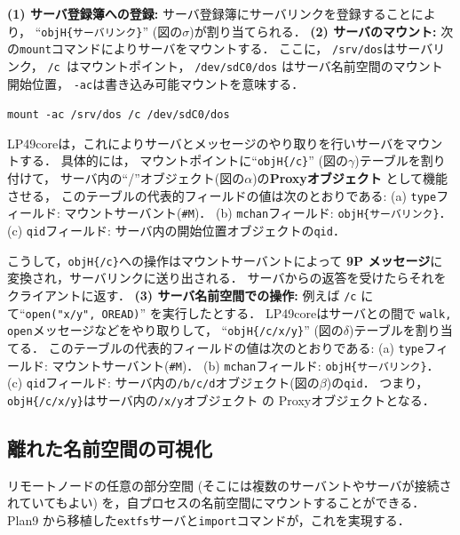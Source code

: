 \documentclass{ieicej}
\begin{document}
{\bf\flushleft (1) サーバ登録簿への登録: }
  サーバ登録簿にサーバリンクを登録することにより，
  ``{\tt objH\{サーバリンク\}}'' (図の$\sigma$)が割り当てられる．
%
{\bf\flushleft  (2) サーバのマウント: }
   次の{\tt mount}コマンドによりサーバをマウントする．
   ここに， {\tt /srv/dos}はサーバリンク，
   {\tt /c }はマウントポイント，
   {\tt /dev/sdC0/dos} はサーバ名前空間のマウント開始位置，
   {\tt -ac}は書き込み可能マウントを意味する．

   \verb|mount -ac /srv/dos /c /dev/sdC0/dos|

  LP49coreは，これによりサーバとメッセージのやり取りを行いサーバをマウントする．
  具体的には，
  マウントポイントに``{\tt objH\{/c\}}'' (図の$\gamma$)テーブルを割り付けて，
  サーバ内の``/''オブジェクト(図の$\alpha$)の{\bf Proxyオブジェクト}
  として機能させる，
%
    このテーブルの代表的フィールドの値は次のとおりである: 
    (a) {\tt type}フィールド: マウントサーバント(\verb|#M|)．
    (b) {\tt mchan}フィールド: {\tt objH\{サーバリンク\}}．
    (c) {\tt qid}フィールド: サーバ内の開始位置オブジェクトの{\tt qid}．

    こうして，{\tt objH\{/c\}}への操作はマウントサーバントによって
    {\bf 9P メッセージ}に変換され，サーバリンクに送り出される．
   サーバからの返答を受けたらそれをクライアントに返す．
%
{\bf\flushleft (3) サーバ名前空間での操作: }
   例えば {\tt /c} にて``{\tt open("x/y", OREAD)}'' を実行したとする．
   LP49coreはサーバとの間で {\tt walk, open}メッセージなどをやり取りして，
   ``{\tt objH\{/c/x/y\}}'' (図の$\delta$)テーブルを割り当てる．
    このテーブルの代表的フィールドの値は次のとおりである:
    (a) {\tt type}フィールド: マウントサーバント(\verb|#M|)．
    (b) {\tt mchan}フィールド: {\tt objH\{サーバリンク\}}．
    (c) {\tt qid}フィールド: サーバ内の{\tt /b/c/d}オブジェクト(図の$\beta$)の{\tt qid}．
    つまり，{\tt objH\{/c/x/y\}}はサーバ内の{\tt /x/y}オブジェクト
    の Proxyオブジェクトとなる．


\subsection{離れた名前空間の可視化}\label{sec:extfs}

リモートノードの任意の部分空間
(そこには複数のサーバントやサーバが接続されていてもよい)
を，自プロセスの名前空間にマウントすることができる．
Plan9 から移植した{\tt extfs}サーバと{\tt import}コマンドが，これを実現する．
\end{document}
